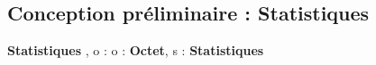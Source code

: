 \subsection{Conception préliminaire : Statistiques}

\begin{algorithme}
    {}{\textbf{Statistiques}}
    {}
    {, o : }
    {}
    {o : \textbf{Octet}, s : \textbf{Statistiques}}
    {\naturel}
    {}
\end{algorithme}